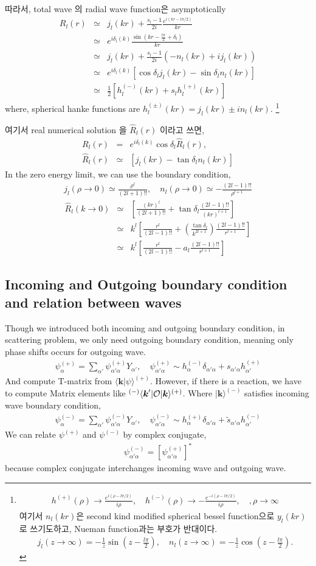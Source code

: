 \documentclass[10pt]{article}
\def\bm{\boldsymbol}
\newcommand{\bea}{\begin{eqnarray}}
\newcommand{\eea}{\end{eqnarray}}
\newcommand{\no}{\nonumber \\}
\def\vk{{\bm k}}
\def\la{\langle}
\def\ra{\rangle}
\begin{document}
따라서, total wave 의 radial wave function은 
asymptotically
\bea
R_{l}(r)&\simeq& 
j_l(kr)+\frac{s_l-1}{2i}\frac{e^{i(kr-l\pi/2)}}{kr}\no
&\simeq& e^{i\delta_l(k)}\frac{\sin(kr-\frac{l\pi}{2}+\delta_l)}{kr}\no
&\simeq& j_l(kr)+\frac{s_l-1}{2i}(-n_l(kr)+i j_l(kr)) \no
&\simeq& e^{i\delta_l(k)}[\cos\delta_l j_l(kr)-\sin\delta_l n_l(kr)] \no
&\simeq& \frac{1}{2}[h^{(-)}_l(kr)+s_l h^{(+)}_l(kr)]  
\eea
where, spherical hanke functions are 
$h^{(\pm)}_l(kr)=j_l(kr)\pm i n_{l}(kr)$.
\footnote{
\bea
h^{(+)}(\rho)\to \frac{e^{i(\rho-l\pi/2)}}{i\rho},
\quad h^{(-)}(\rho)\to -\frac{e^{-i(\rho-l\pi/2)}}{i\rho}, 
\quad , \rho\to \infty
\eea
여기서 $n_l(kr)$은 second kind modified spherical bessel function으로
$y_{l}(kr)$ 로 쓰기도하고, Nueman function과는 부호가 반대이다.
\bea
j_l(z\to \infty)=-\frac{1}{z}\sin(z-\frac{l\pi}{2}),\quad
n_l(z\to \infty)=-\frac{1}{z}\cos(z-\frac{l\pi}{2}).
\eea
}

여기서  real numerical solution 을 $\hat{R}_l(r)$ 이라고 
쓰면, 
\bea
R_l(r)&=&e^{i\delta_l(k)}\cos\delta_l \hat{R}_{l}(r),\no
\hat{R}_l(r)&\simeq& [j_l(kr)-\tan\delta_l n_l(kr)]
\eea
In the zero energy limit, we can use
the boundary condition, 
\bea
j_l(\rho\to 0)\simeq \frac{\rho^l}{(2l+1)!!},\quad
n_l(\rho\to 0)\simeq -\frac{(2l-1)!!}{\rho^{l+1}}
\eea 
\bea
\hat{R}_l(k\to 0)&\simeq& [\frac{(kr)^l}{(2l+1)!!}
                   +\tan\delta_l\frac{(2l-1)!!}{(kr)^{l+1}}]\no
            &\simeq&  k^l\left[ 
            \frac{r^l}{(2l-1)!!}+\left(\frac{\tan\delta_l}{k^{2l+1}}
            \right)\frac{(2l-1)!!}{r^{l+1}}
            \right]
            \no        
            &\simeq& 
            k^l\left[ \frac{r^l}{(2l-1)!!}-a_l \frac{(2l-1)!!}{r^{l+1}}
            \right]
\eea

\subsection{Incoming and Outgoing boundary condition and relation between waves}
Though we introduced both incoming and outgoing boundary condition, in scattering problem,
we only need outgoing boundary condition, meaning only phase shifts occurs for outgoing wave.
\bea 
\psi^{(+)}_\alpha=\sum_{\alpha'} \psi_{\alpha'\alpha}^{(+)} Y_{\alpha'},
\quad  \psi_{\alpha'\alpha}^{(+)}\sim h^{(-)}_{\alpha}\delta_{\alpha'\alpha }
                                     +s_{\alpha'\alpha} h^{(+)}_{\alpha'}     
\eea 
And compute T-matrix from $\la \vk|\psi\ra^{(+)}$.
However, if there is a reaction, we have to compute Matrix elements like
$^{(-)}\la \vk'|{\cal O}|\vk\ra^{(+)}$. Where $|\vk\ra^{(-)}$ satisfies
incoming wave boundary condition,
\bea 
\psi^{(-)}_\alpha=\sum_{\alpha'} \psi_{\alpha'\alpha}^{(-)} Y_{\alpha'},
\quad  \psi_{\alpha'\alpha}^{(-)}\sim h^{(+)}_{\alpha}\delta_{\alpha'\alpha }
                                        +\tilde{s}_{\alpha'\alpha} h^{(-)}_{\alpha'}     
\eea 
We can relate $\psi^{(+)}$ and $\psi^{(-)}$ by complex conjugate,
\bea 
\psi^{(-)}_{\alpha'\alpha} = [\psi^{(+)}_{\alpha'\alpha}]^*
\eea 
because complex conjugate interchanges incoming wave and outgoing wave.
\end{document}
